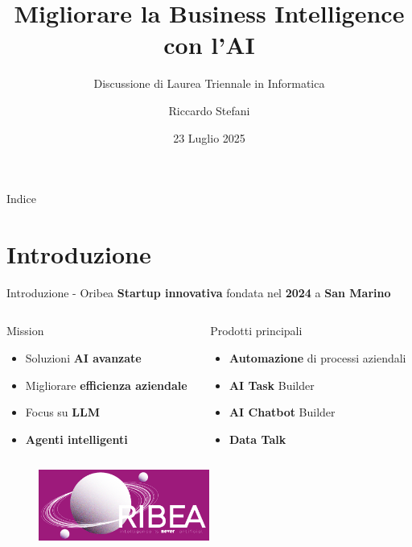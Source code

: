 \documentclass{beamer}
\title{Migliorare la Business Intelligence con l'AI}
\subtitle{Discussione di Laurea Triennale in Informatica}
\author{Riccardo Stefani}
\date{23 Luglio 2025}
\begin{document}
	\maketitle

	\begin{frame}{Indice}
		\tableofcontents
	\end{frame}


	\section{Introduzione}

	\begin{frame}{Introduzione - Oribea}
		\textbf{Startup innovativa} fondata nel \textbf{2024} a \textbf{San Marino}

		\begin{columns}
			\begin{column}{0.5\textwidth}
				\begin{alertblock}{Mission}
					\begin{itemize}
						\item Soluzioni \textbf{AI avanzate}
						\item Migliorare \textbf{efficienza aziendale}
						\item Focus su \textbf{LLM}
						\item \textbf{Agenti intelligenti}
					\end{itemize}
				\end{alertblock}
			\end{column}
			\begin{column}{0.5\textwidth}
				\begin{exampleblock}{Prodotti principali}
					\begin{itemize}
						\item \textbf{Automazione} di processi aziendali
						\item \textbf{AI Task} Builder
						\item \textbf{AI Chatbot} Builder
						\item \textbf{Data Talk}
					\end{itemize}
				\end{exampleblock}
			\end{column}
		\end{columns}

		\begin{figure}[h]
			\centering
			\includegraphics[width=0.5\textwidth]{oribea-logo.png}
		\end{figure}
	\end{frame}
\end{document}
